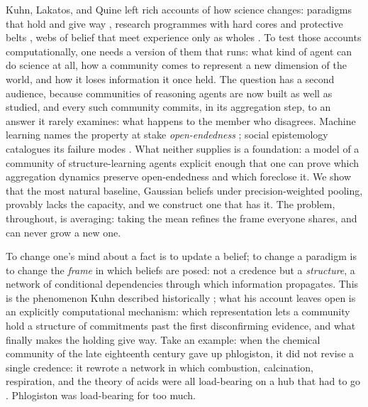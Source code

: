 \documentclass[runningheads]{llncs}
\begin{document}
Kuhn, Lakatos, and Quine left rich accounts of how science changes: paradigms that hold and
give way \citep{kuhn1962}, research programmes with hard cores and protective belts
\citep{lakatos1970}, webs of belief that meet experience only as wholes \citep{quine1951}. To
test those accounts computationally, one needs a version of them that runs: what kind
of agent can do science at all, how a community comes to represent a new dimension of the
world, and how it loses information it once held. The question has a second audience, because
communities of reasoning agents are now built as well as studied, and every such
community commits, in its aggregation step, to an answer it rarely examines: what happens to
the member who disagrees. Machine learning names the property at stake \emph{open-endedness}
\citep{stanley2017oe,hughes2024}; social epistemology catalogues its failure modes
\citep{nguyen2018,zollman2010}. What neither supplies is a foundation: a model of a
community of structure-learning agents explicit enough that one can prove which
aggregation dynamics preserve open-endedness and which foreclose it. We show that the most
natural baseline, Gaussian beliefs under precision-weighted pooling, provably lacks the
capacity, and we construct one that has it. The problem, throughout, is averaging: taking the
mean refines the frame everyone shares, and can never grow a new one.

To change one's mind about a fact is to update a belief; to change a paradigm is to change the
\emph{frame} in which beliefs are posed: not a credence but a \emph{structure}, a network of
conditional dependencies through which information propagates. This is the phenomenon Kuhn
described historically \citep{kuhn1962}; what his account leaves open is an explicitly
computational mechanism: which representation lets a community hold a structure of
commitments past the first disconfirming evidence, and what finally makes the holding give
way. Take an example:
when the chemical community of the late eighteenth century gave up phlogiston, it did not
revise a single credence: it rewrote a network in which combustion, calcination, respiration,
and the theory of acids were all load-bearing on a hub that had to go
\citep{blumenthal2017,holmes2000,boantza2011}. Phlogiston was load-bearing for too much.
\end{document}
